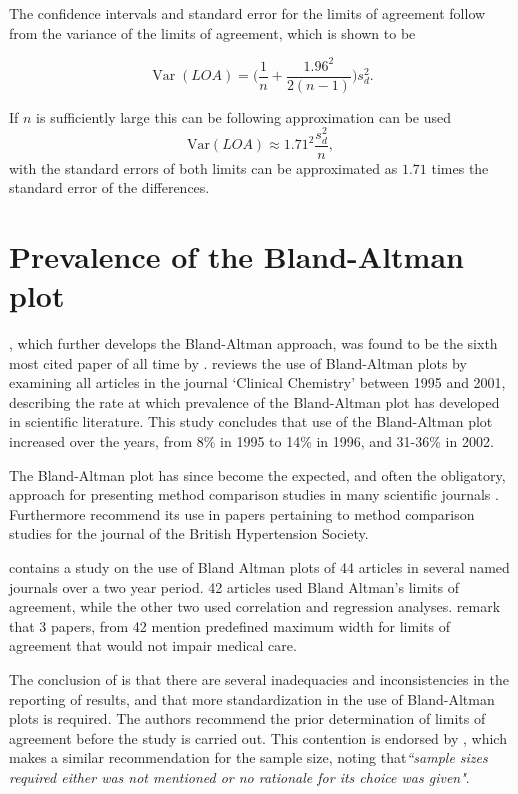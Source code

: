 \documentclass[12pt, a4paper]{report}
\theoremstyle{plain}
\theoremstyle{definition}
\theoremstyle{remark}
\begin{document}
	The confidence intervals and standard error for the limits of agreement follow from the variance of the limits of agreement, which is shown to be
	
	\[
	\operatorname{Var}(LOA) = \bigg(\frac{1}{n}+\frac{1.96^{2}}{2(n-1)}\bigg)s_{d}^{2}.
	\]
	
	If $n$ is sufficiently large this can be following approximation can be used
	\[
	\mbox{Var}(LOA) \approx 1.71^{2}\frac{s_{d}^{2}}{n},
	\]
with the standard errors of both limits can be approximated as $1.71$ times the standard error of the differences.


\section{Prevalence of the Bland-Altman plot}

\citet*{BA86}, which further develops the Bland-Altman approach,
was found to be the sixth most cited paper of all time by \citet{BAcite}. \cite{Dewitte} reviews the use of Bland-Altman plots by examining all articles in the journal `Clinical Chemistry' between 1995 and 2001, describing the rate at which
prevalence of the Bland-Altman plot has developed in scientific
literature. This study concludes that use of the Bland-Altman plot increased over the years, from 8\% in 1995 to
14\% in 1996, and 31-36\% in 2002.

The Bland-Altman plot has since become the expected, and often the obligatory, approach for presenting method comparison
studies in many scientific journals \citep{hollis}. Furthermore \citet{BritHypSoc} recommend its use in papers pertaining to
method comparison studies for the journal of the British Hypertension Society.


\citet{mantha} contains a study on the use of Bland Altman plots of 44 articles in several named journals over a two year period. 42 articles used Bland Altman's limits of agreement, while the other two used correlation and regression analyses. \citet{mantha} remark that 3 papers, from 42 mention predefined maximum width for limits of agreement that would not impair medical care.

The conclusion of \citet{mantha} is that there are several inadequacies and inconsistencies in the reporting of results, and
that more standardization in the use of Bland-Altman plots is required. The authors recommend the prior determination of limits of agreement before the study is carried out. This contention is endorsed by \citet{lin}, which makes a similar recommendation for the sample size, noting that\emph{``sample sizes required either was not mentioned or no rationale for its choice was given"}.
\end{document}
